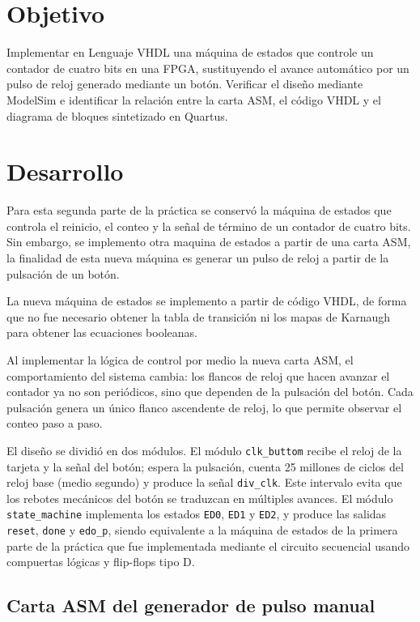 \documentclass[letterpaper,12pt]{article}
\begin{document}

\newpage

\section{Objetivo}

Implementar en Lenguaje VHDL una máquina de estados que controle un contador de cuatro bits en una FPGA, sustituyendo el avance automático por un pulso de reloj generado mediante un botón. Verificar el diseño mediante ModelSim e identificar la relación entre la carta ASM, el código VHDL y el diagrama de bloques sintetizado en Quartus.

\section{Desarrollo}

Para esta segunda parte de la práctica se conservó la máquina de estados que controla el reinicio, el conteo y la señal de término de un contador de cuatro bits. Sin embargo, se implemento otra maquina de estados a partir de una carta ASM, la finalidad de esta nueva máquina es generar un pulso de reloj a partir de la pulsación de un botón.

La nueva máquina de estados se implemento a partir de código VHDL, de forma que no fue necesario obtener la tabla de transición ni los mapas de Karnaugh para obtener las ecuaciones booleanas.

Al implementar la lógica de control por medio la nueva carta ASM, el comportamiento del sistema cambia: los flancos de reloj que hacen avanzar el contador ya no son periódicos, sino que dependen de la pulsación del botón. Cada pulsación genera un único flanco ascendente de reloj, lo que permite observar el conteo paso a paso.

El diseño se dividió en dos módulos. El módulo \texttt{clk\_buttom} recibe el reloj de la tarjeta y la señal del botón; espera la pulsación, cuenta 25 millones de ciclos del reloj base (medio segundo) y produce la señal \texttt{div\_clk}. Este intervalo evita que los rebotes mecánicos del botón se traduzcan en múltiples avances. El módulo \texttt{state\_machine} implementa los estados \texttt{ED0}, \texttt{ED1} y \texttt{ED2}, y produce las salidas \texttt{reset}, \texttt{done} y \texttt{edo\_p}, siendo equivalente a la máquina de estados de la primera parte de la práctica que fue implementada mediante el circuito secuencial usando compuertas lógicas y flip-flops tipo D.

\subsection{Carta ASM del generador de pulso manual}
\end{document}
